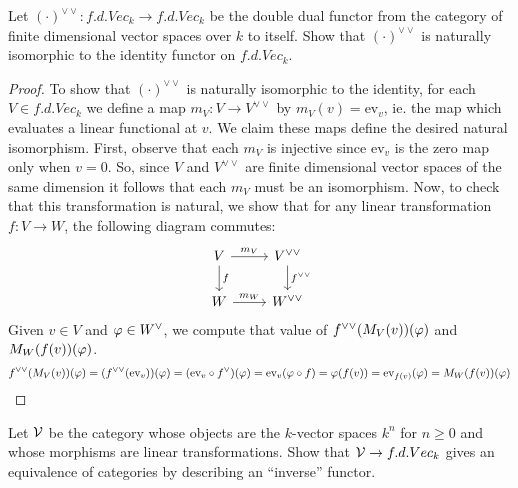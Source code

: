 \begin{exercise}
    Let $(\cdot)^{\vee \vee}: f.d.Vec_k \to f.d.Vec_k$ be the double dual functor from the category of finite dimensional vector spaces over $k$ to itself. Show that $(\cdot)^{\vee \vee}$ is naturally isomorphic to the identity functor on $f.d.Vec_k$. 
\end{exercise}

\begin{proof}
    To show that $(\cdot)^{\vee \vee}$ is naturally isomorphic to the identity, for each $V \in f.d.Vec_k$ we define a map $m_V: V \to V^{\vee \vee}$ by $m_V(v) = \text{ev}_v$, ie. the map which evaluates a linear functional at $v$. We claim these maps define the desired natural isomorphism. First, observe that each $m_V$ is injective since $\text{ev}_v$ is the zero map only when $v = 0$. So, since $V$ and $V^{\vee \vee}$ are finite dimensional vector spaces of the same dimension it follows that each $m_V$ must be an isomorphism. Now, to check that this transformation is natural, we show that for any linear transformation $f: V \to W$, the following diagram commutes: 
    \[ \begin{tikzcd}
        V \arrow[r, "m_V"] \arrow[d, "f"] & V^{\vee \vee} \arrow[d, "f^{\vee \vee}"] \\ 
        W \arrow[r, "m_W"] & W^{\vee \vee}
    \end{tikzcd} \]
    Given $v \in V$ and $\varphi \in W^{\vee}$, we compute that value of $f^{\vee \vee}(M_V(v))(\varphi)$ and $M_W( f(v))(\varphi)$. \\
    \[ f^{\vee \vee}(M_V(v))(\varphi) = (f^{\vee \vee}(\text{ev}_v))(\varphi) = (\text{ev}_v \circ f^{\vee})(\varphi) = \text{ev}_v( \varphi \circ f) = \varphi(f(v)) = \text{ev}_{f(v)}(\varphi) = M_W(f(v))(\varphi)\] 
\end{proof}

\begin{exercise}
    Let $\mathcal{V}$ be the category whose objects are the $k$-vector spaces $k^n$ for $n \ge 0$ and whose morphisms are linear transformations. Show that $\mathcal{V} \to f.d.Vec_k$ gives an equivalence of categories by describing an ``inverse'' functor.
\end{exercise}

